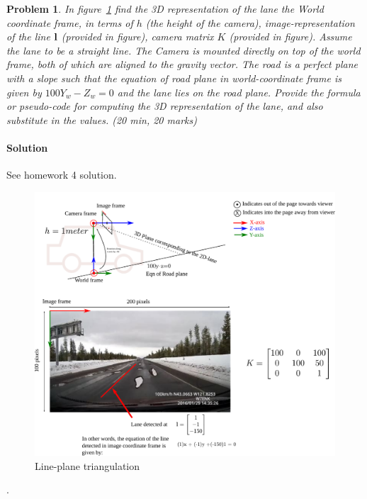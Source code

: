 \documentclass{article}
\newtheorem{prob}{Problem}
\begin{document}
\begin{prob}
  In figure~\ref{fig:line-plane-triangulation} find the 3D representation of the
  lane the World coordinate frame, in terms of $h$ (the height of the camera),
  image-representation of the line $\mathbf{l}$ (provided in figure), camera matrix
  $K$ (provided in figure). Assume the lane to be a straight line.
  The Camera is mounted directly on top of the
  world frame, both of which are aligned to the gravity vector.
  The road is a perfect plane with a slope such that the equation of road plane
  in world-coordinate frame is given by $100 Y_w - Z_w = 0$ and the lane lies
  on the road plane. Provide the formula or pseudo-code for computing the
  3D representation of the lane, and also substitute in the values. (20 min, 20 marks)
\end{prob}

\paragraph*{Solution}

See homework 4 solution.

\begin{figure}
  \includegraphics[width=\linewidth]{media/image-road-triangulation-line-plane.pdf}
  \caption{Line-plane triangulation}
  \label{fig:line-plane-triangulation}
\end{figure}

\newpage
.
\newpage
\end{document}
